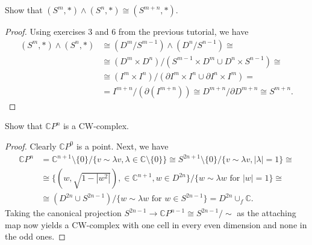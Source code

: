 \documentclass[12pt,a4paper]{article}
\newcommand{\C}{\mathbb{C}}
\newcommand{\dd}{\partial}
\begin{document}
\pagestyle{fancy}                      %
\fancyhf{}                             %
\addtolength{\topmargin}{-30 pt}                   %
\setlength{\headsep}{10 pt}                      %
\renewcommand{\headrulewidth}{1 pt}                %
\renewcommand*{\proofname}{Solution}

\ex Show that $(S^m,*)\wedge (S^n,*)\cong (S^{m+n},*)$.
\begin{proof} Using exercises 3 and 6 from the previous tutorial, we have 
\begin{equation*}
\begin{split}
(S^m,*)\wedge (S^n,*)&\cong (D^m/S^{m-1})\wedge(D^n/S^{n-1})\cong \\
&\cong(D^m\times D^n)/(S^{m-1}\times D^m\cup D^n\times S^{n-1})\cong\\
&\cong  (I^m\times I^n)/(\dd I^m\times I^n\cup \dd I^n\times I^m)=\\
&=I^{m+n}/(\dd (I^{m+n}))\cong D^{m+n}/\dd D^{m+n}\cong S^{m+n}.
\end{split}
\end{equation*}

\end{proof}

\ex Show that $\C P^n$ is a CW-complex.
\begin{proof}
Clearly $\C P^0$ is a point. Next, we have
\begin{equation*}
\begin{split}
\C P^n&=\C^{n+1}\setminus\{0\}/\{v\sim \lambda v, \lambda\in\C\setminus\{0\}\}\cong S^{2n+1}\setminus\{0\}/\{v\sim \lambda v, |\lambda|=1\}\cong\\
&\cong \{(w,\sqrt{1-|w^2|}),\in \C^{n+1},w\in D^{2n}\}/\{w\sim \lambda w \text{ for }|w|=1\}\cong\\
&\cong (D^{2n}\cup S^{2n-1})/\{w\sim \lambda w \text{ for }w\in S^{2n-1}\}=D^{2n}\cup_f\C.
\end{split}
\end{equation*}
Taking the canonical projection $S^{2n-1}\to\C P^{n-1}\cong S^{2n-1}/\sim$ as the attaching map now yields a CW-complex with one cell in every even dimension and none in the odd ones.
\end{proof}
\end{document}
